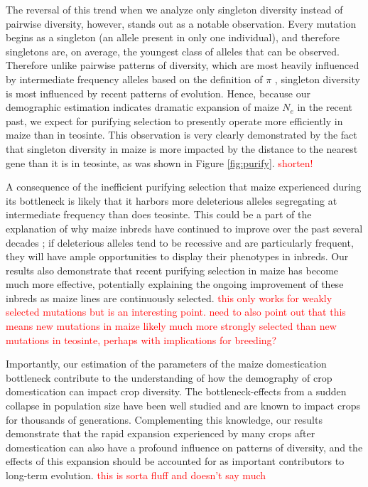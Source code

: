\documentclass{pnastwo}
\newcommand{\jri}[1]{\textcolor{red}{\scriptsize #1}}
\begin{document}
\begin{article}
The reversal of this trend when we analyze only singleton diversity instead of pairwise diversity, however, stands out as a notable observation. Every mutation begins as a singleton (an allele present in only one individual), and therefore singletons are, on average, the youngest class of alleles that can be observed. Therefore unlike pairwise patterns of diversity, which are most heavily influenced by intermediate frequency alleles based on the definition of $\pi$ \cite{nei1979}, singleton diversity is most influenced by recent patterns of evolution. Hence, because our demographic estimation indicates dramatic expansion of maize $N_e$ in the recent past, we expect for purifying selection to presently operate more efficiently in maize than in teosinte. This observation is very clearly demonstrated by the fact that singleton diversity in maize is more impacted by the distance to the nearest gene than it is in teosinte, as was shown in Figure \ref{fig:purify}. \jri{shorten!}

A consequence of the inefficient purifying selection that maize experienced during its bottleneck is likely that it harbors more deleterious alleles segregating at intermediate frequency than does teosinte. This could be a part of the explanation of why maize inbreds have continued to improve over the past several decades \cite{meghji1984}; if deleterious alleles tend to be recessive and are particularly frequent, they will have ample opportunities to display their phenotypes in inbreds. Our results also demonstrate that recent purifying selection in maize has become much more effective, potentially explaining the ongoing improvement of these inbreds as maize lines are continuously selected. \jri{this only works for weakly selected mutations but is an interesting point. need to also point out that this means new mutations in maize likely much more strongly selected than new mutations in teosinte, perhaps with implications for breeding?}

 Importantly, our estimation of the parameters of the maize domestication bottleneck contribute to the understanding of how the demography of crop domestication can impact crop diversity. The bottleneck-effects from a sudden collapse in population size have been well studied and are known to impact crops for thousands of generations. Complementing this knowledge, our results demonstrate that the rapid expansion experienced by many crops after domestication can also have a profound influence on patterns of diversity, and the effects of this expansion should be accounted for as important contributors to long-term evolution. \jri{this is sorta fluff and doesn't say much}


\end{article}
\end{document}

